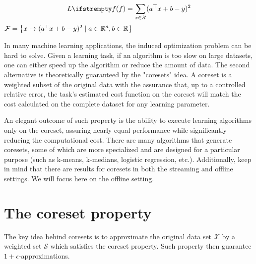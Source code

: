 \begin{example}
    \begin{equation*}
        \loss{\query} = \sum_{x\in \mathcal{X}} (a\T x +b -y)^2
    \end{equation*}
    $\mathcal{F} = \left\{x \mapsto (a^\top x + b -y)^2 \mid a \in \mathbb{R}^d, b \in \mathbb{R}\right\}$
\end{example}
    

In many machine learning applications, the induced optimization problem can be hard to solve. Given a learning task, if an algorithm is too slow on large datasets, one can either speed up the algorithm or reduce the amount of data.
The second alternative is theoretically guaranteed by the "coresets" idea.
A coreset is a weighted subset of the original data with the assurance that, up to a controlled relative error, the task's estimated cost function on the coreset will match the cost calculated on the complete dataset for any learning parameter.

An elegant outcome of such property is the ability to execute learning algorithms only on the coreset, assuring nearly-equal performance while significantly reducing the computational cost. There are many algorithms that generate coresets, some of which are more specialized and are designed for a particular purpose (such as k-means, k-medians, logistic regression, etc.). Additionally, keep in mind that there are results for coresets in both the streaming and offline settings. We will focus here on the offline setting.


\section{The coreset property}

The key idea behind coresets is to approximate the original data
set $\mathcal{X}$ by a weighted set $\mathcal{S}$ which satisfies the coreset property. Such property then guarantee $1+\epsilon$-approximations.

